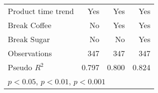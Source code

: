 {\begin{longtable}{l*{3}{D{.}{.}{-1}}}
Product time trend  &         Yes         &         Yes         &         Yes         \\
Break Coffee        &          No         &         Yes         &         Yes         \\
Break Sugar         &          No         &          No         &         Yes         \\
\hline
Observations        &         347         &         347         &         347         \\
Pseudo \(R^{2}\)    &       0.797         &       0.800         &       0.824         \\
\hline\hline
{}\\
\end{longtable}
}
